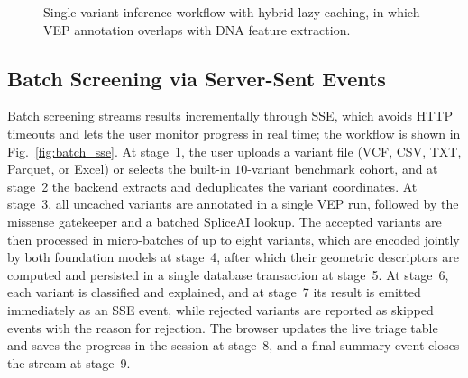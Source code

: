 \begin{figure}[htbp]
    \centering
    \caption{Single-variant inference workflow with hybrid lazy-caching, in which VEP annotation overlaps with DNA feature extraction.}
    \label{fig:single_sequence}
\end{figure}

\subsection{Batch Screening via Server-Sent Events}

Batch screening streams results incrementally through SSE, which avoids HTTP timeouts and lets the user monitor progress in real time; the workflow is shown in Fig.~\ref{fig:batch_sse}. At stage~1, the user uploads a variant file (VCF, CSV, TXT, Parquet, or Excel) or selects the built-in $10$-variant benchmark cohort, and at stage~2 the backend extracts and deduplicates the variant coordinates. At stage~3, all uncached variants are annotated in a single VEP run, followed by the missense gatekeeper and a batched SpliceAI lookup. The accepted variants are then processed in micro-batches of up to eight variants, which are encoded jointly by both foundation models at stage~4, after which their geometric descriptors are computed and persisted in a single database transaction at stage~5. At stage~6, each variant is classified and explained, and at stage~7 its result is emitted immediately as an SSE event, while rejected variants are reported as skipped events with the reason for rejection. The browser updates the live triage table and saves the progress in the session at stage~8, and a final summary event closes the stream at stage~9.

